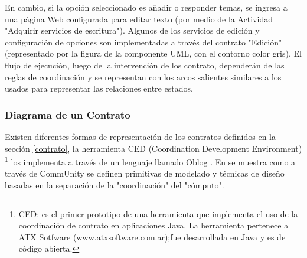 En cambio, si la opción seleccionado es añadir o responder temas, se ingresa a
una página Web configurada para editar texto (por medio de la Actividad
"Adquirir servicios de escritura"). Algunos de los servicios de edición y
configuración de opciones son implementadas a través del contrato "Edición"
(representado por la figura de la componente UML, con el contorno color gris).
El flujo de ejecución, luego de la intervención de los contrato, dependerán de
las reglas de coordinación y se representan con los arcos salientes similares a
los usados para representar las relaciones entre estados.


\subsubsection{Diagrama de un Contrato}

Existen diferentes formas de representación de los contratos definidos en la
sección \ref{contrato}, la herramienta  CED (Coordination Development
Environment) \footnote{CED: es el primer prototipo de una herramienta que
implementa el uso de la coordinación de contrato en aplicaciones Java. La
herramienta pertenece a ATX Sotfware (www.atxsoftware.com.ar);fue desarrollada
en Java y es de código abierta.} los implementa a través de un lenguaje llamado
Oblog \cite{lenguajeoblog}. En \cite{communit} se muestra como a través de
CommUnity se definen primitivas de modelado y técnicas de diseño basadas en la
separación de la "coordinación" del "cómputo". 

